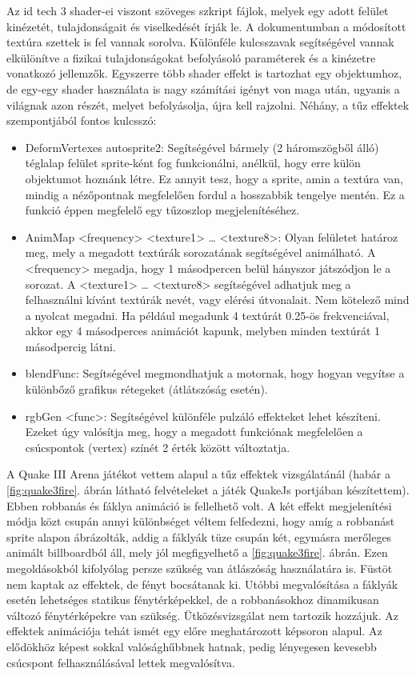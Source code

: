 Az id tech 3 shader-ei viszont szöveges szkript fájlok, melyek egy adott felület kinézetét, tulajdonságait és viselkedését írják le. A dokumentumban a módosított textúra szettek is fel vannak sorolva. Különféle kulcsszavak segítségével vannak elkülönítve a fizikai tulajdonságokat befolyásoló paraméterek és a kinézetre vonatkozó jellemzők. Egyszerre több shader effekt is tartozhat egy objektumhoz, de egy-egy shader használata is nagy számítási igényt von maga után, ugyanis a világnak azon részét, melyet befolyásolja, újra kell rajzolni. \cite{quake3shaderManual} Néhány, a tűz effektek szempontjából fontos kulcsszó: 
\begin{itemize} 
\item
DeformVertexes autosprite2: Segítségével bármely (2 háromszögből álló) téglalap felület sprite-ként fog funkcionálni, anélkül, hogy erre külön objektumot hoznánk létre. Ez annyit tesz, hogy a sprite, amin a textúra van, mindig a nézőpontnak megfelelően fordul a hosszabbik tengelye mentén. Ez a funkció éppen megfelelő egy tűzoszlop megjelenítéséhez.
\item
AnimMap <frequency> <texture1> … <texture8>: Olyan felületet határoz meg, mely a megadott textúrák sorozatának segítségével animálható. A <frequency> megadja, hogy 1 másodpercen belül hányszor játszódjon le a sorozat. A <texture1> … <texture8> segítségével adhatjuk meg a felhasználni kívánt textúrák nevét, vagy elérési útvonalait. Nem kötelező mind a nyolcat megadni. Ha például megadunk 4 textúrát 0.25-ös frekvenciával, akkor egy 4 másodperces animációt kapunk, melyben minden textúrát 1 másodpercig látni. 
\item
blendFunc: Segítségével megmondhatjuk a motornak, hogy hogyan vegyítse a különbőző grafikus rétegeket (átlátszóság esetén).
\item
rgbGen <func>: Segítségével különféle pulzáló effekteket lehet készíteni. Ezeket úgy valósítja meg, hogy a megadott funkciónak megfelelően a csúcspontok (vertex) színét 2 érték között változtatja.
\end{itemize} 
 \cite{quake3shaderManual}

A Quake III Arena játékot vettem alapul a tűz effektek vizsgálatánál (habár a \ref{fig:quake3fire}. ábrán látható felvételeket a játék QuakeJs portjában készítettem). Ebben robbanás és fáklya animáció is fellelhető volt. A két effekt megjelenítési módja közt csupán annyi különbséget véltem felfedezni, hogy amíg a robbanást sprite alapon ábrázolták, addig a fáklyák tüze csupán két, egymásra merőleges animált billboardból áll, mely jól megfigyelhető a \ref{fig:quake3fire}. ábrán. Ezen megoldásokból kifolyólag persze szükség van átlászóság használatára is. Füstöt nem kaptak az effektek, de fényt bocsátanak ki. Utóbbi megvalósítása a fáklyák esetén lehetséges statikus fénytérképekkel, de a robbanásokhoz dinamikusan változó fénytérképekre van szükség. Ütközésvizsgálat nem tartozik hozzájuk. Az effektek animációja tehát ismét egy előre meghatározott képsoron alapul. Az elődökhöz képest sokkal valósághűbbnek hatnak, pedig lényegesen kevesebb csúcspont felhasználásával lettek megvalósítva.

